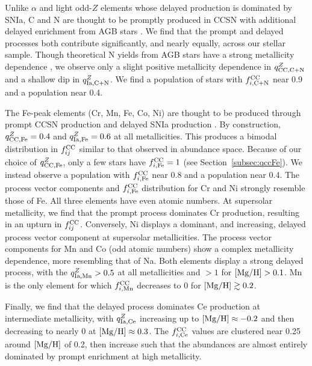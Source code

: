 \documentclass[modern]{aastex631}
\newcommand{\mgh}{[{\rm Mg}/{\rm H}]}
\newcommand{\qccFe}{q_{{\rm CC, Fe}}^{Z}}
\newcommand{\qIaFe}{q_{{\rm Ia,Fe}}^{Z}}
\newcommand{\fcc}{f_{ij}^{\rm CC}}
\newcommand{\qccX}[1]{q_{{\rm CC, #1}}^{Z}}
\newcommand{\qIaX}[1]{q_{{\rm Ia, #1}}^{Z}}
\newcommand{\fccX}[1]{f_{i, {\rm #1}}^{\rm CC}}
\begin{document}
Unlike $\alpha$ and light odd-$Z$ elements whose delayed production is dominated by SNIa, C and N are thought to be promptly produced in CCSN with additional delayed enrichment from AGB stars \citep[e.g.][]{andrews2017}. We find that the prompt and delayed processes both contribute significantly, and nearly equally, across our stellar sample. Though theoretical N yields from AGB stars have a strong metallicity dependence \citep{karakas2010, ventura2013, cristallo2015, johnson2022}, we observe only a slight positive metallicity dependence in $\qccX{C+N}$ and a shallow dip in $\qIaX{C+N}$. We find a population of stars with $\fccX{C+N}$ near 0.9 and a population near 0.4. 

The Fe-peak elements (Cr, Mn, Fe, Co, Ni) are thought to be produced through prompt CCSN production and delayed SNIa production \citep[e.g.][]{andrews2017}. By construction, $\qccFe=0.4$ and $\qIaFe=0.6$ at all metallicities. This produces a bimodal distribution in $\fcc$ similar to that observed in abundance space. Because of our choice of $\qccFe$, only a few stars have $\fccX{Fe}=1$ (see Section~\ref{subsec:qccFe}). We instead observe a population with $\fccX{Fe}$ near 0.8 and a population near 0.4. The process vector components and $\fccX{Fe}$ distribution for Cr and Ni strongly resemble those of Fe. All three elements have even atomic numbers. At supersolar metallicity, we find that the prompt process dominates Cr production, resulting in an upturn in $\fcc$. Conversely, Ni displays a dominant, and increasing, delayed process vector component at supersolar metallicities. The process vector components for Mn and Co (odd atomic numbers) show a complex metallicity dependence, more resembling that of Na. Both elements display a strong delayed process, with the $\qIaX{Mn} > 0.5$ at all metallicities and $> 1$ for $\mgh > 0.1$. Mn is the only element for which $\fccX{Mn}$ decreases to 0 for $\mgh \gtrsim 0.2$. 

Finally, we find that the delayed process dominates Ce production at intermediate metallicity, with $\qIaX{Ce}$ increasing up to $\mgh \approx -0.2$ and then decreasing to nearly 0 at $\mgh \approx 0.3$. The $\fccX{Ce}$ values are clustered near 0.25 around $\mgh$ of 0.2, then increase such that the abundances are almost entirely dominated by prompt enrichment at high metallicity.
\end{document}
